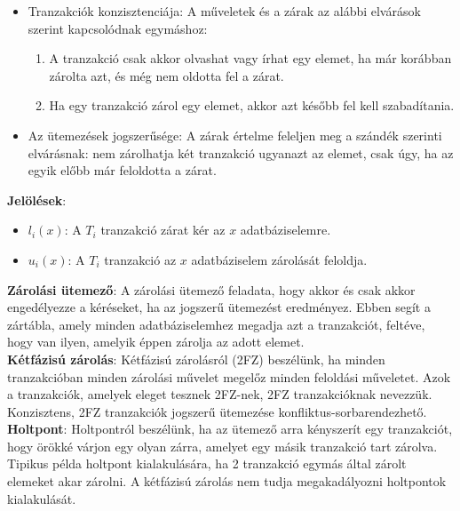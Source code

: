 \documentclass[margin=0px]{article}
\begin{document}
	\begin{itemize}
		\item	Tranzakciók konzisztenciája: A műveletek és a zárak az alábbi elvárások szerint kapcsolódnak egymáshoz:
		\begin{enumerate}
			\item	A tranzakció csak akkor olvashat vagy írhat egy elemet, ha már korábban zárolta azt, és még nem oldotta
			fel a zárat.

			\item	Ha egy tranzakció zárol egy elemet, akkor azt később fel kell szabadítania.
		\end{enumerate}
		
		\item	Az ütemezések jogszerűsége: A zárak értelme feleljen meg a szándék szerinti elvárásnak: nem zárolhatja két tranzakció
		ugyanazt az elemet, csak úgy, ha az egyik előbb már feloldotta a zárat.
	\end{itemize}
	
	\noindent \textbf{Jelölések}:
	\begin{itemize}
		\item	$l_{i}(x)$: A $T_{i}$ tranzakció zárat kér az $x$ adatbáziselemre.
		\item	$u_{i}(x)$: A $T_{i}$ tranzakció az $x$ adatbáziselem zárolását feloldja.
	\end{itemize}
	
	\noindent \textbf{Zárolási ütemező}: A zárolási ütemező feladata, hogy akkor és csak akkor engedélyezze a kéréseket, ha
	az jogszerű ütemezést eredményez. Ebben segít a zártábla, amely minden adatbáziselemhez megadja azt a tranzakciót, feltéve, hogy
	van ilyen, amelyik éppen zárolja az adott elemet.\\
	
	\noindent \textbf{Kétfázisú zárolás}: Kétfázisú zárolásról (2FZ) beszélünk, ha minden tranzakcióban minden zárolási művelet
	megelőz minden feloldási műveletet. Azok a tranzakciók, amelyek eleget tesznek 2FZ-nek, 2FZ tranzakcióknak nevezzük. Konzisztens,
	2FZ tranzakciók	jogszerű ütemezése konfliktus-sorbarendezhető.\\
	
	\noindent \textbf{Holtpont}: Holtpontról beszélünk, ha az ütemező arra kényszerít egy tranzakciót, hogy örökké várjon egy olyan
	zárra, amelyet egy másik tranzakció tart zárolva. Tipikus példa holtpont kialakulására, ha 2 tranzakció egymás által zárolt
	elemeket akar zárolni. A kétfázisú zárolás nem tudja megakadályozni holtpontok kialakulását.
	
\end{document}

